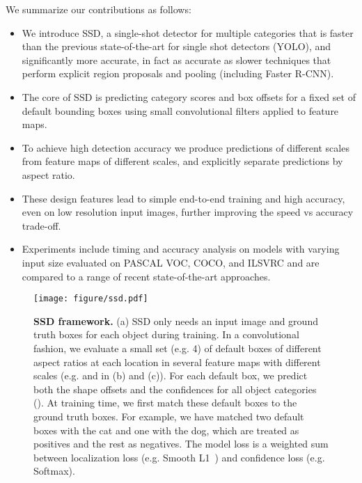 \documentclass[runningheads]{llncs}
\begin{document}
We summarize our contributions as follows:
\begin{itemize}
\item We introduce SSD, a single-shot detector for multiple categories that is faster than the previous state-of-the-art for single shot detectors (YOLO), and significantly more accurate, in fact as accurate as slower techniques that perform explicit region proposals and pooling (including Faster R-CNN).

\item The core of SSD is predicting category scores and box offsets for a fixed set of default bounding boxes using small convolutional filters applied to feature maps.

\item To achieve high detection accuracy we produce predictions of different scales from feature maps of different scales, and explicitly separate predictions by aspect ratio.

\item These design features lead to simple end-to-end training and high accuracy, even on low resolution input images, further improving the speed vs accuracy trade-off.

\item Experiments include timing and accuracy analysis on models with varying input size evaluated on PASCAL VOC, COCO, and ILSVRC and are compared to a range of recent state-of-the-art approaches.
\end{itemize}

\begin{figure}[tbp]
    \centering
    \texttt{[image: figure/ssd.pdf]}
    \caption{\textbf{SSD framework.} (a) SSD only needs an input image and ground truth boxes for each object during training. In a convolutional fashion, we evaluate a small set (e.g. 4) of default boxes of different aspect ratios at each location in several feature maps with different scales (e.g.  and  in (b) and (c)). For each default box, we predict both the shape offsets and the confidences for all object categories (). At training time, we first match these default boxes to the ground truth boxes. For example, we have matched two default boxes with the cat and one with the dog, which are treated as positives and the rest as negatives. The model loss is a weighted sum between localization loss (e.g. Smooth L1~\cite{girshick2015fast}) and confidence loss (e.g. Softmax).}
    \label{fig:ssdframework}
\end{figure}
\end{document}
